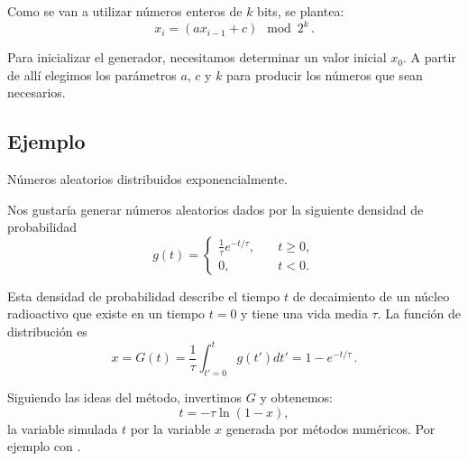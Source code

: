 \documentclass[openany]{book}
\begin{document}
Como se van a utilizar números enteros de $k$ bits, se plantea:
\begin{equation}
  \label{eq:LCG-bin}
  x_{i}=(ax_{i-1}+c)\mod{2^{k}}\,.
\end{equation}

Para inicializar el generador, necesitamos determinar un valor inicial $x_0$. A partir de allí elegimos los parámetros $a$, $c$ y $k$ para producir los números que sean necesarios.

\subsection{Ejemplo}
\textrm{\large{Números aleatorios distribuidos exponencialmente.}}
\vspace{2mm}
\par Nos gustaría generar números aleatorios dados por la siguiente densidad de probabilidad
\begin{equation*}
  g(t)=\begin{cases}
    \frac{1}{\tau}e^{-t/\tau},\quad &t\geq0,\\
    0, \quad &t<0. 
  \end{cases}
\end{equation*}
\par Esta densidad de probabilidad describe el tiempo $t$ de decaimiento de un núcleo radioactivo que existe en un tiempo $t=0$ y tiene una vida media $\tau$. La función de distribución es
\begin{equation*}
  x=G(t)=\frac{1}{\tau}\int_{t'=0}^{t}g(t')dt'=1-e^{-t/\tau}\,.
\end{equation*}
\par Siguiendo las ideas del método, invertimos $G$ y obtenemos:
\begin{equation*}
  t=-\tau\ln{(1-x)},
\end{equation*}
la variable simulada $t$ por la variable $x$ generada por métodos numéricos. Por ejemplo con .
\end{document}
